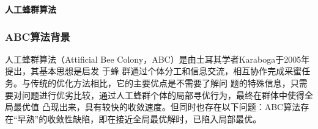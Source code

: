 \begin{frame}
\newcommand{\song}{\setCJKfamilyfont{song}}
\newcommand{\xiaoer}{\fontsize{18pt}{18pt}\selectfont}
	\begin{center}
	{\song\xiaoer\textbf{人工蜂群算法}}
	\end{center}
\end{frame}

\begin{frame}
  \frametitle{ABC算法背景}
	\qquad 人工蜂群算法（Attificial Bee Colony，ABC）是由土耳其学者Karaboga于2005年提出，其基本思想是启发 	 	于蜂	群通过个体分工和信息交流，相互协作完成采蜜任务。与传统的优化方法相比，它的主要优点是不需要了解问    	题的特殊信息，只需要对问题进行优劣比较，通过人工蜂群个体的局部寻优行为，最终在群体中使得全局最优值	 	凸现出来，具有较快的收敛速度。但同时也存在以下问题：ABC算法存在“早熟”的收敛性缺陷，即在接近全局最优解时，已陷入局部最优。

\end{frame}

